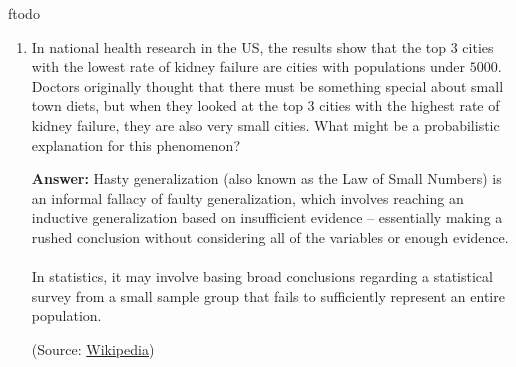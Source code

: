 ƒtodo\documentclass{article}
\newenvironment{QandA}{\begin{enumerate}[label=\arabic*.]}{\end{enumerate}}
\newenvironment{answer}{\par\normalfont \textbf{Answer:}}{}
\newcommand{\Exp}[1]{\mathbb{E}\left[ #1 \right]}
\newcommand{\g}{\vert}
\begin{document}
\begin{QandA}
\begin{answer}
\begin{align*}
        \end{align*}
        with the same logic applying as above. By similar logic, $\Exp{X \g HT} = \Exp{X}$. Moreover, $\Exp{X \g HH} = 0$ since we don't need any additional flips. \\\\
        Therefore, we have the following equations:
        \begin{align*}
            \Exp{X} &= \frac{1}{2} \left( 1 + \Exp{X \g H} \right) + \frac{1}{2} \left( 1 + \Exp{X} \right) \\
            \Exp{X \g H} &= \frac{1}{2} \left( 1 + 0 \right) + \frac{1}{2} \left( 1 + \Exp{X} \right) = 1 + \frac{1}{2}\Exp{X}
        \end{align*}
        By substituting the expression for $\Exp{X \g H}$, we obtain $\Exp{X} = 6$.
        
        (Source: \href{https://qr.ae/pvgtDB}{Quora})
    \end{answer}
    
    \item In national health research in the US, the results show that the top $3$ cities with the lowest rate of kidney failure are cities with populations under $5000$. Doctors originally thought that there must be something special about small town diets, but when they looked at the top $3$ cities with the highest rate of kidney failure, they are also very small cities. What might be a probabilistic explanation for this phenomenon?
    \begin{answer}
        Hasty generalization (also known as the Law of Small Numbers) is an informal fallacy of faulty generalization, which involves reaching an inductive generalization based on insufficient evidence -- essentially making a rushed conclusion without considering all of the variables or enough evidence. \\\\
        In statistics, it may involve basing broad conclusions regarding a statistical survey from a small sample group that fails to sufficiently represent an entire population. 
        
        (Source: \href{https://en.wikipedia.org/wiki/Faulty_generalization#Hasty_generalization}{Wikipedia})
    \end{answer}
    

\end{QandA}
\end{document}
